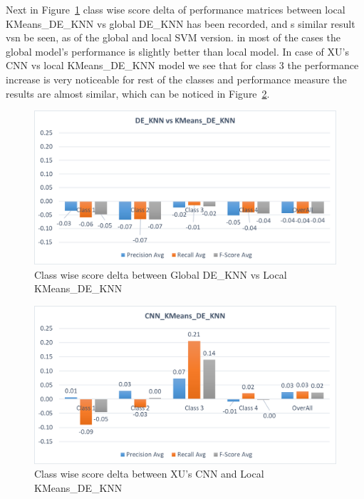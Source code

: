 \documentclass[sigconf]{acmart}
\theoremstyle{break}
\begin{document}
    Next in Figure~\ref{fig:Global_vs_Local_DE_KNN} class wise score delta of performance matrices between local KMeans\_DE\_KNN vs global DE\_KNN has been recorded, and s similar result vsn be seen, as of the global and local SVM version. in most of the cases the global model's performance is slightly better than local model. In case of XU's CNN vs local KMeans\_DE\_KNN model we see that for class 3 the performance increase is very noticeable for rest of the classes and performance measure the results are almost similar, which can be noticed in Figure~\ref{fig:CNN_vs_KMeans_DE_KNN}.
    
    \begin{figure}
        \centering
        \includegraphics[width=\linewidth]{fig/KNN_vs_KMeans.png}
        \caption{Class wise score delta between Global DE\_KNN vs Local KMeans\_DE\_KNN}
        \label{fig:Global_vs_Local_DE_KNN}
    \end{figure}
    
    \begin{figure}
        \centering
        \includegraphics[width=\linewidth]{fig/cnn_vs_Kmeans_Knn.png}
        \caption{Class wise score delta between XU's CNN and Local KMeans\_DE\_KNN}
        \label{fig:CNN_vs_KMeans_DE_KNN}
    \end{figure}
    
\end{document}
